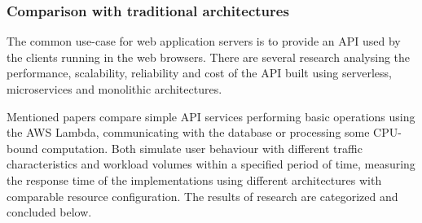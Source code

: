 

\subsubsection{Comparison with traditional architectures} \label{chapter:comparison-with-traditional-architectures}

The common use-case for web application servers is to provide an API used by the clients running in the web browsers.
There are several research \cite{ServerlessComputingAnInvestigationOfDeploymentEnvironmentsForWebAPIs}\cite{MicroservicesvsServerlessAPerformanceComparisonOnCloudNativeWebApplication} analysing the performance, scalability, reliability and cost of the API built using serverless, microservices and monolithic architectures.

Mentioned papers compare simple API services performing basic operations using the AWS Lambda, communicating with the database or processing some CPU-bound computation.
Both simulate user behaviour with different traffic characteristics and workload volumes within a specified period of time, measuring the response time of the implementations using different architectures with comparable resource configuration. The results of research are categorized and concluded below.




